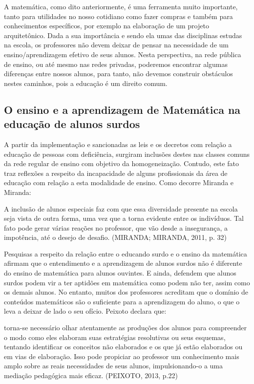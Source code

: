 \documentclass[brasil]{abnt}
\begin{document}
	A matemática, como dito anteriormente, é uma ferramenta muito importante, tanto para utilidades no nosso cotidiano como fazer compras e também para conhecimentos específicos, por exemplo na elaboração 
	de um projeto arquitetônico. Dada a sua importância e sendo ela umas das disciplinas estudas na escola, os professores não devem deixar de pensar na necessidade de um ensino/aprendizagem 
	efetivo de seus alunos. Nesta perspectiva, na rede pública de ensino, ou até mesmo nas redes privadas, poderemos encontrar algumas diferenças entre nossos alunos, para tanto, não devemos construir
	obstáculos nestes caminhos, pois a educação é um direito comum. 
	
 
\subsection{O ensino e a aprendizagem de Matemática na educação de alunos surdos}	
	A partir da implementação e sancionadas as leis e os decretos com relação a educação de pessoas com deficiência, surgiram inclusões destes nas classes comuns da rede regular de ensino com objetivo da 
	homogeneização. Contudo, este fato traz reflexões a respeito da incapacidade de alguns profissionais da área de educação com relação a esta modalidade de ensino. Como decorre Miranda e Miranda:
		
			\begin{citacao} A inclusão de alunos especiais faz com que essa diversidade presente na escola seja vista de outra forma, uma vez que a torna evidente entre os indivíduos. Tal fato pode gerar 
							várias reações no professor, que vão desde a insegurança, a impotência, até o desejo de desafio. (MIRANDA; MIRANDA, 2011, p. 32)   			
			\end{citacao}
						
	Pesquisas a respeito da relação entre o educando surdo e o ensino da matemática afirmam que o entendimento e a aprendizagem de alunos surdos não é diferente do ensino de matemática para alunos ouvintes. 
	E ainda, defendem que alunos surdos podem vir a ter aptidões em matemática como podem não ter, assim como os demais alunos. No entanto, muitos dos professores acreditam que o domínio de conteúdos 
	matemáticos são o suficiente para a aprendizagem do aluno, o que o leva a deixar de lado o seu ofício. Peixoto declara que:
	
		\begin{citacao}[...] torna-se necessário olhar atentamente as produções dos alunos para compreender o modo como eles elaboram suas estratégias resolutivas ou seus esquemas, tentando identificar 
						os conceitos não elaborados e os que já estão elaborados ou em vias de elaboração. Isso pode propiciar ao professor um conhecimento mais amplo sobre as reais necessidades de seus 
						alunos, impulsionando-o a uma mediação pedagógica mais eficaz. (PEIXOTO, 2013, p.22)
		\end{citacao}
	
\end{document}
